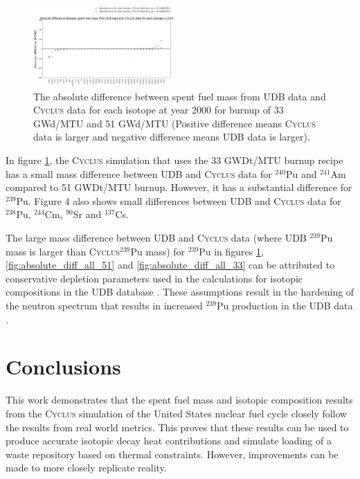 \documentclass{anstrans}
\newcommand{\Cyclus}{\textsc{Cyclus}\xspace}%
\begin{document}
\begin{figure}[t] %
	\centering
	\includegraphics[width=0.48\textwidth]{figures/absolute_diff_2000}
	\caption{The absolute difference between spent fuel mass from UDB data and \Cyclus data for each isotope at year 2000 for burnup of 33 GWd/MTU and 51 GWd/MTU (Positive difference means \Cyclus data is larger and negative difference means UDB data is larger).}
	\label{fig:absolute_diff_2000}
\end{figure} 

In figure \ref{fig:absolute_diff_2000}, the \Cyclus simulation that uses the 33 GWDt/MTU burnup recipe has a small mass difference between UDB and \Cyclus data for $^{240}$Pu and $^{241}$Am compared to 51 GWDt/MTU burnup. However, it has a substantial difference for $^{239}$Pu. Figure 4 also shows small differences between UDB and \Cyclus data for $^{238}$Pu, $^{244}$Cm, $^{90}$Sr and $^{137}$Cs. 

The large mass difference between UDB and \Cyclus data (where UDB $^{239}$Pu mass is larger than \Cyclus $^{239}$Pu mass) for $^{239}$Pu in figures \ref{fig:absolute_diff_2000}, \ref{fig:absolute_diff_all_51} and \ref{fig:absolute_diff_all_33} can be attributed to conservative depletion parameters used in the calculations for isotopic compositions in the UDB database \cite{peterson_additional_2017}. These assumptions result in the hardening of the neutron spectrum that results in increased $^{239}$Pu production in the UDB data \cite{peterson_additional_2017}. 

\section{Conclusions}
This work demonstrates that the spent fuel mass and isotopic composition results from the \Cyclus simulation of the United States nuclear fuel cycle closely follow the results from real world metrics. This proves that these results can be used to produce accurate isotopic decay heat contributions and simulate loading of a waste repository based on thermal constraints. However, improvements can be made to more closely replicate reality.  
\end{document}
